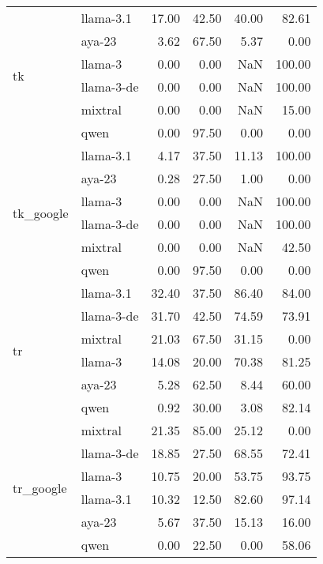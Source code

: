 \begin{tabular}{llrrrr}
\cline{1-6}
\multirow[t]{6}{*}{tk} & llama-3.1 & 17.00 & 42.50 & 40.00 & 82.61 \\
 & aya-23 & 3.62 & 67.50 & 5.37 & 0.00 \\
 & llama-3 & 0.00 & 0.00 & NaN & 100.00 \\
 & llama-3-de & 0.00 & 0.00 & NaN & 100.00 \\
 & mixtral & 0.00 & 0.00 & NaN & 15.00 \\
 & qwen & 0.00 & 97.50 & 0.00 & 0.00 \\
\cline{1-6}
\multirow[t]{6}{*}{tk_google} & llama-3.1 & 4.17 & 37.50 & 11.13 & 100.00 \\
 & aya-23 & 0.28 & 27.50 & 1.00 & 0.00 \\
 & llama-3 & 0.00 & 0.00 & NaN & 100.00 \\
 & llama-3-de & 0.00 & 0.00 & NaN & 100.00 \\
 & mixtral & 0.00 & 0.00 & NaN & 42.50 \\
 & qwen & 0.00 & 97.50 & 0.00 & 0.00 \\
\cline{1-6}
\multirow[t]{6}{*}{tr} & llama-3.1 & 32.40 & 37.50 & 86.40 & 84.00 \\
 & llama-3-de & 31.70 & 42.50 & 74.59 & 73.91 \\
 & mixtral & 21.03 & 67.50 & 31.15 & 0.00 \\
 & llama-3 & 14.08 & 20.00 & 70.38 & 81.25 \\
 & aya-23 & 5.28 & 62.50 & 8.44 & 60.00 \\
 & qwen & 0.92 & 30.00 & 3.08 & 82.14 \\
\cline{1-6}
\multirow[t]{6}{*}{tr_google} & mixtral & 21.35 & 85.00 & 25.12 & 0.00 \\
 & llama-3-de & 18.85 & 27.50 & 68.55 & 72.41 \\
 & llama-3 & 10.75 & 20.00 & 53.75 & 93.75 \\
 & llama-3.1 & 10.32 & 12.50 & 82.60 & 97.14 \\
 & aya-23 & 5.67 & 37.50 & 15.13 & 16.00 \\
 & qwen & 0.00 & 22.50 & 0.00 & 58.06 \\
\cline{1-6}
\bottomrule
\end{tabular}
